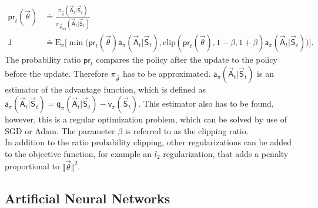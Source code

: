 \begin{align}
\mathsf{pr}_t(\vec{\theta}) &\doteq \frac{\pi_{\vec{\theta}}(\vec{\mathsf{A}}_t \vert \vec{\mathsf{S}}_t)}{\pi_{\vec{\theta}_{old}} (\vec{\mathsf{A}}_t \vert \vec{\mathsf{S}}_t)} \\
\mathsf{J} &\doteq \mathrm{E}_\pi  \bigg[\min \Big(\mathsf{pr}_t(\vec{\theta}) \mathsf{a}_\pi(\vec{\mathsf{A}}_t \vert \vec{\mathsf{S}}_t), \mathrm{clip}(\mathsf{pr}_t(\vec{\theta}), 1- \beta, 1+\beta) \mathsf{a}_\pi(\vec{\mathsf{A}}_t \vert \vec{\mathsf{S}}_t) \Big) \bigg]. \label{eq:object_ppo}
\end{align}
The probability ratio $\mathsf{pr}_t$ compares the policy after the update to the policy before the update. Therefore $\pi_{\vec{\theta}}$ has to be approximated. $\mathsf{a}_\pi(\vec{\mathsf{A}}_t \vert \vec{\mathsf{S}}_t)$ is an estimator of the advantage function, which is defined as $\mathsf{a}_\pi(\vec{\mathsf{A}}_t \vert \vec{\mathsf{S}}_t) = \mathsf{q}_\pi(\vec{\mathsf{A}}_t \vert \vec{\mathsf{S}}_t) - \mathsf{v}_\pi(\vec{\mathsf{S}}_t)$. This estimator also has to be found, however, this is a regular optimization problem, which can be solved by use of SGD or Adam. The parameter $\beta$ is referred to as the clipping ratio. \cite{schulman_proximal_2017} \\
In addition to the ratio probability clipping, other regularizations can be added to the objective function, for example an $l_2$ regularization, that adds a penalty proportional to $\Vert\vec{\theta}\Vert^2$.
\subsection{Artificial Neural Networks}
